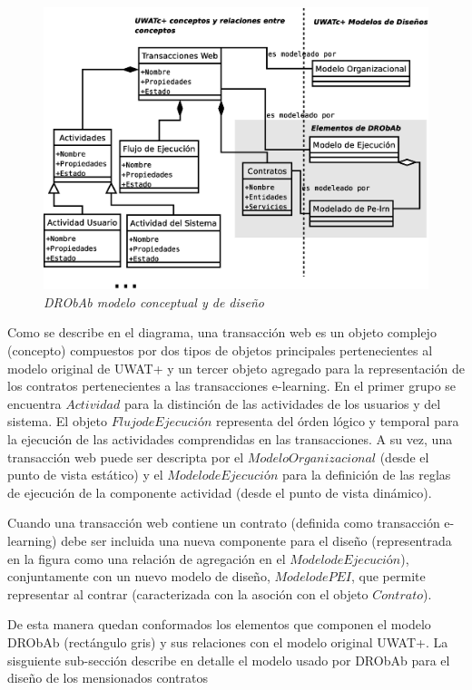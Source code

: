 \documentclass{llncs}
\begin{document}
	\begin{figure}[!h]
        \begin{center}
	\includegraphics[width=5 in,totalheight=2 in]{drobab.eps}
	\caption{\small \sl DRObAb modelo conceptual y de diseño} \label{drobab}
         \end{center}
         \end{figure}


Como se describe en el diagrama, una transacción web es un objeto complejo (concepto) compuestos por dos tipos de objetos principales pertenecientes al modelo original de UWAT+ y un tercer objeto  agregado para la representación de los contratos pertenecientes a las transacciones e-learning. En el primer grupo se encuentra $Actividad$ para la distinción de las actividades de los usuarios y del sistema. El objeto $Flujo de Ejecución$ representa del órden lógico y temporal para la ejecución de las actividades comprendidas en las transacciones. A su vez, una transacción web puede ser descripta por el $Modelo Organizacional$ (desde el punto de vista estático) y el $Modelo de Ejecución$ para la definición de las reglas de ejecución de la componente actividad (desde el punto de vista dinámico). 

Cuando una transacción web contiene un contrato (definida como transacción e-learning) debe ser incluida una nueva componente para el diseño (representrada en la figura como una relación de agregación en el $Modelo de Ejecución$), conjuntamente con un nuevo modelo de diseño, $Modelo de PEI$, que permite representar al contrar (caracterizada con la asoción con el objeto $Contrato$).

De esta manera quedan conformados los elementos que componen el modelo DRObAb (rectángulo gris) y sus relaciones con el modelo original UWAT+. La sisguiente sub-sección describe en detalle el modelo usado por DRObAb para el diseño de los mensionados contratos  
\end{document}

